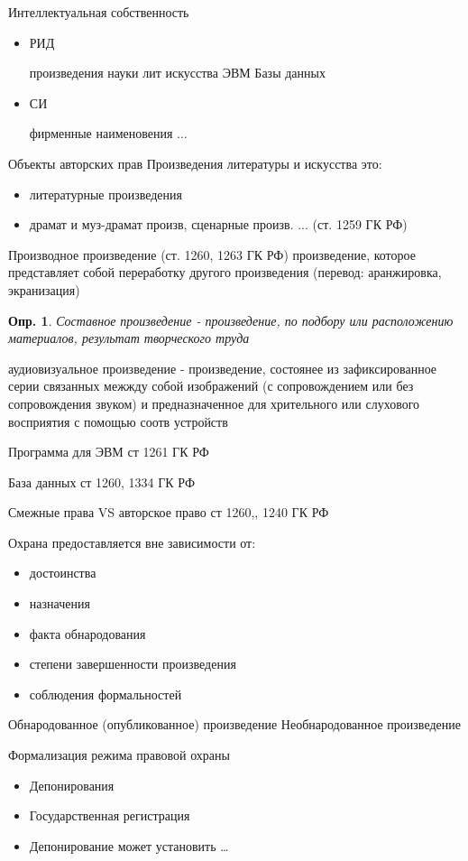 \documentclass[12pt]{article}
\newtheorem{definition}{Опр.}
\begin{document}
Интеллектуальная собственность
\begin{itemize}
\item  РИД

произведения науки лит искусства
ЭВМ
Базы данных

\item СИ

фирменные наименовения ...
\end{itemize}

Объекты авторских прав
Произведения литературы и искусства это:
\begin{itemize}
\item литературные произведения
\item драмат и муз-драмат произв, сценарные произв.
... (ст. 1259 ГК РФ)
\end{itemize}

Производное произведение (ст. 1260, 1263 ГК РФ)
произведение, которое представляет собой переработку другого произведения (перевод: аранжировка, экранизация)

\begin{definition}
Составное произведение - произведение, по подбору или расположению материалов, результат творческого труда
\end{definition}

аудиовизуальное произведение - произведение, состоянее из зафиксированное серии связанных межжду собой изображений 
(с сопровождением или без сопровождения звуком) и предназначенное для хрительного или слухового восприятия с
помощью соотв устройств

Программа для ЭВМ
ст 1261 ГК РФ

База данных 
ст 1260, 1334 ГК РФ

Смежные права VS авторское право ст 1260,, 1240 ГК РФ

Охрана предоставляется вне зависимости от:
\begin{itemize}
\item достоинства
\item назначения
\item факта обнародования
\item степени завершенности произведения
\item соблюдения формальностей
\end{itemize}

Обнародованное (опубликованное) произведение
Необнародованное произведение

Формализация режима правовой охраны
\begin{itemize}
\item Депонирования
\item Государственная регистрация
\item Депонирование может установить \dots
\end{itemize}
\end{document}
